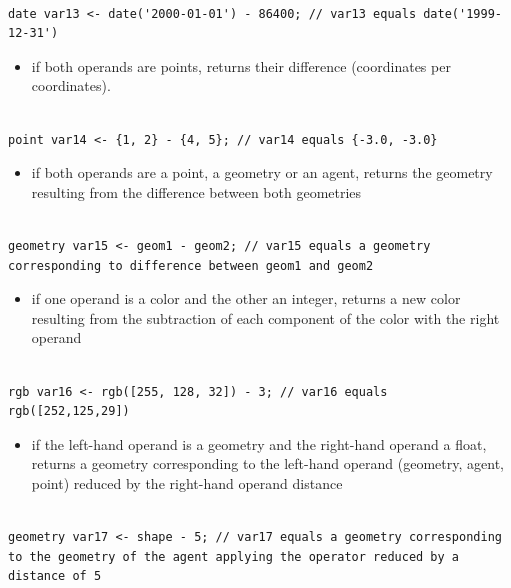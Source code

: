 \documentclass[]{book}
\providecommand{\tightlist}{%
  \setlength{\itemsep}{0pt}\setlength{\parskip}{0pt}}
\theoremstyle{definition}
\theoremstyle{definition}
\theoremstyle{definition}
\theoremstyle{remark}
\begin{document}
\begin{verbatim}
 
date var13 <- date('2000-01-01') - 86400; // var13 equals date('1999-12-31')
\end{verbatim}

\begin{itemize}
\tightlist
\item
  if both operands are points, returns their difference (coordinates per
  coordinates).
\end{itemize}

\begin{verbatim}
 
point var14 <- {1, 2} - {4, 5}; // var14 equals {-3.0, -3.0}
\end{verbatim}

\begin{itemize}
\tightlist
\item
  if both operands are a point, a geometry or an agent, returns the
  geometry resulting from the difference between both geometries
\end{itemize}

\begin{verbatim}
 
geometry var15 <- geom1 - geom2; // var15 equals a geometry corresponding to difference between geom1 and geom2
\end{verbatim}

\begin{itemize}
\tightlist
\item
  if one operand is a color and the other an integer, returns a new
  color resulting from the subtraction of each component of the color
  with the right operand
\end{itemize}

\begin{verbatim}
 
rgb var16 <- rgb([255, 128, 32]) - 3; // var16 equals rgb([252,125,29])
\end{verbatim}

\begin{itemize}
\tightlist
\item
  if the left-hand operand is a geometry and the right-hand operand a
  float, returns a geometry corresponding to the left-hand operand
  (geometry, agent, point) reduced by the right-hand operand distance
\end{itemize}

\begin{verbatim}
 
geometry var17 <- shape - 5; // var17 equals a geometry corresponding to the geometry of the agent applying the operator reduced by a distance of 5
\end{verbatim}
\end{document}
